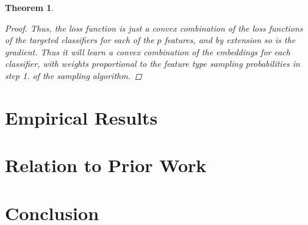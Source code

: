 \documentclass{article} %
\newtheorem{theorem}{Theorem}
\begin{document}
\begin{theorem}
\begin{proof}
Thus, the loss function is just a convex combination  of the loss functions of the targeted classifiers for each of the $p$ features, and by extension so is the gradient. Thus it will learn a convex combination of the embeddings for each classifier, with weights proportional to the feature type sampling probabilities in step 1. of the sampling algorithm.

\end{proof}
\end{theorem}


\section{Empirical Results}


\section{Relation to Prior Work}


\section{Conclusion}





\end{document}
